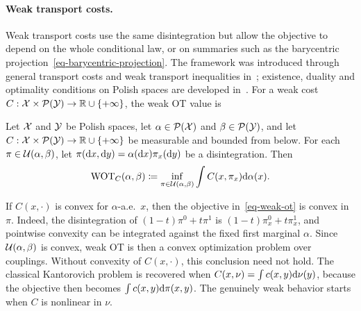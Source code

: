 \paragraph{Weak transport costs.}
Weak transport costs use the same disintegration but allow the objective to depend on the whole conditional law, or on summaries such as the barycentric projection~\eqref{eq-barycentric-projection}. The framework was introduced through general transport costs and weak transport inequalities in~\cite{gozlan2017kantorovich}; existence, duality and optimality conditions on Polish spaces are developed in~\cite{backhoff2019weak}. For a weak cost $C:\mathcal{X}\times\mathcal{P}(\mathcal{Y})\to\mathbb{R}\cup\{+\infty\}$, the weak OT value is
\begin{defn}\label{def-weak-optimal-transport}
Let $\mathcal{X}$ and $\mathcal{Y}$ be Polish spaces, let $\alpha\in\mathcal{P}(\mathcal{X})$ and $\beta\in\mathcal{P}(\mathcal{Y})$, and let $C:\mathcal{X}\times\mathcal{P}(\mathcal{Y})\to\mathbb{R}\cup\{+\infty\}$ be measurable and bounded from below. For each $\pi\in\mathcal{U}(\alpha,\beta)$, let
$\pi(\mathrm{d} x,\mathrm{d} y)=\alpha(\mathrm{d} x)\pi_x(\mathrm{d} y)$ be a disintegration. Then
\begin{equation}\label{eq-weak-ot}
	\operatorname{WOT}_C(\alpha,\beta)
	\coloneqq
	\inf_{\pi\in\mathcal{U}(\alpha,\beta)}
	\int C(x,\pi_x)\mathrm{d}\alpha(x).
\end{equation}
\end{defn}
If $C(x,\cdot)$ is convex for $\alpha$-a.e.\ $x$, then the objective in~\eqref{eq-weak-ot} is convex in $\pi$. Indeed, the disintegration of $(1-t)\pi^0+t\pi^1$ is $(1-t)\pi_x^0+t\pi_x^1$, and pointwise convexity can be integrated against the fixed first marginal $\alpha$. Since $\mathcal{U}(\alpha,\beta)$ is convex, weak OT is then a convex optimization problem over couplings. Without convexity of $C(x,\cdot)$, this conclusion need not hold. The classical Kantorovich problem is recovered when $C(x,\nu)=\int c(x,y)\mathrm{d}\nu(y)$, because the objective then becomes $\int c(x,y)\mathrm{d}\pi(x,y)$. The genuinely weak behavior starts when $C$ is nonlinear in $\nu$.

